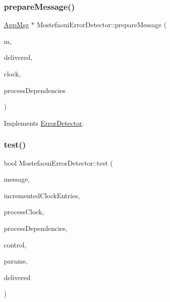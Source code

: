 \subsubsection{\texorpdfstring{prepare\+Message()}{prepareMessage()}}
{\footnotesize\ttfamily \hyperlink{class_app_msg}{App\+Msg} $\ast$ Mostefaoui\+Error\+Detector\+::prepare\+Message (\begin{DoxyParamCaption}\item[{\hyperlink{class_app_msg}{App\+Msg} $\ast$}]{m,  }\item[{const vector$<$ \hyperlink{structures_8h_a7e7bdc1d2fff8a9436f2f352b2711ed6}{message\+Info} $>$ \&}]{delivered,  }\item[{const \hyperlink{class_probabilistic_clock}{Probabilistic\+Clock} \&}]{clock,  }\item[{const \hyperlink{class_total_dependencies}{Total\+Dependencies} \&}]{process\+Dependencies }\end{DoxyParamCaption})\hspace{0.3cm}{\ttfamily [virtual]}}



Implements \hyperlink{class_error_detector_a8cac1f6ac6803da4379df7891789c490}{Error\+Detector}.

\mbox{\label{class_mostefaoui_error_detector_a293f6cf144526bc8694fc4f1fc0daeb5}} 
\subsubsection{\texorpdfstring{test()}{test()}}
{\footnotesize\ttfamily bool Mostefaoui\+Error\+Detector\+::test (\begin{DoxyParamCaption}\item[{\hyperlink{structures_8h_a7e7bdc1d2fff8a9436f2f352b2711ed6}{message\+Info}}]{message,  }\item[{const vector$<$ unsigned int $>$ \&}]{incremented\+Clock\+Entries,  }\item[{const \hyperlink{class_probabilistic_clock}{Probabilistic\+Clock} \&}]{process\+Clock,  }\item[{const \hyperlink{class_total_dependencies}{Total\+Dependencies} \&}]{process\+Dependencies,  }\item[{\hyperlink{class_controller}{Controller} $\ast$}]{control,  }\item[{\hyperlink{class_simulation_parameters}{Simulation\+Parameters} $\ast$}]{params,  }\item[{const vector$<$ \hyperlink{structures_8h_a7e7bdc1d2fff8a9436f2f352b2711ed6}{message\+Info} $>$ \&}]{delivered }\end{DoxyParamCaption})\hspace{0.3cm}{\ttfamily [virtual]}}



